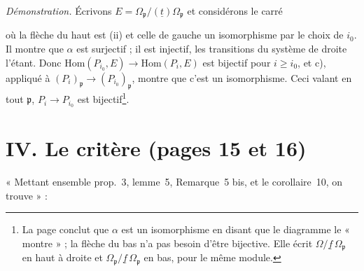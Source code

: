 \documentclass[11pt,a4paper]{article}
\begin{document}
\emph{Démonstration.} Écrivons $E = \Omega_{\mathfrak{p}}/(\underline{t})
\Omega_{\mathfrak{p}}$ et considérons le carré


où la flèche du haut est (ii) et celle de gauche un isomorphisme par le choix
de $i_0$. Il montre que $\alpha$ est surjectif ; il est injectif, les
transitions du système de droite l'étant. Donc $\mathrm{Hom}(P_{i_0}, E) \to
\mathrm{Hom}(P_i, E)$ est bijectif pour $i \geq i_0$, et c), appliqué à
$(P_i)_{\mathfrak{p}} \to (P_{i_0})_{\mathfrak{p}}$, montre que c'est un
isomorphisme. Ceci valant en tout $\mathfrak{p}$, $P_i \to P_{i_0}$ est
bijectif\footnote{La page conclut que $\alpha$ est un isomorphisme en disant
que le diagramme le « montre » ; la flèche du bas n'a pas besoin d'être
bijective. Elle écrit $\Omega/\underline{f}\,\Omega_{\mathfrak{p}}$ en haut à
droite et $\Omega_{\mathfrak{p}}/\underline{f}\,\Omega_{\mathfrak{p}}$ en bas,
pour le même module.}.

\section*{IV. Le critère (pages 15 et 16)}

« Mettant ensemble prop.~3, lemme~5, Remarque~5 bis, et le corollaire~10, on
trouve » :
\end{document}
